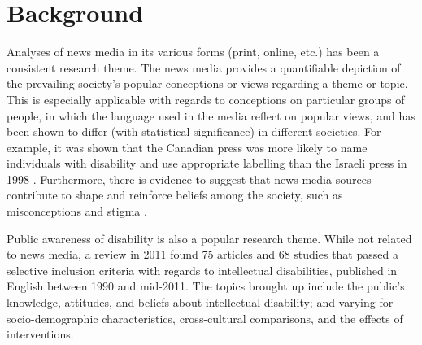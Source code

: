 \documentclass{report}
\begin{document}




\section{Background} \label{Background}  %

Analyses of news media in its various forms (print, online, etc.) has been a consistent research theme. 
The news media provides a quantifiable depiction of the prevailing society's popular conceptions or views regarding a theme or topic.
This is especially applicable with regards to conceptions on particular groups of people, in which the language used in the media reflect on popular views, and has been shown to differ (with statistical significance) in different societies.
For example, it was shown that the Canadian press was more likely to name individuals with disability and use appropriate labelling than the Israeli press in 1998 \cite{gold1999media}.
Furthermore, there is evidence to suggest that news media sources contribute to shape and reinforce beliefs among the society, such as misconceptions and stigma \cite{wahl1992mass}.

Public awareness of disability is also a popular research theme.
While not related to news media, a review in 2011 \cite{scior2011public} found 75 articles and 68 studies that passed a selective inclusion criteria with regards to intellectual disabilities, published in English between 1990 and mid-2011.
The topics brought up include the public's knowledge, attitudes, and beliefs about intellectual disability; and varying for socio-demographic characteristics, cross-cultural comparisons, and the effects of interventions.
\end{document}
